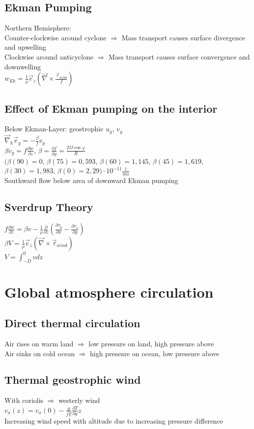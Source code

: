 \subsection*{Ekman Pumping}
Northern Hemisphere:\\
Counter-clockwise around cyclone $\Rightarrow$ Mass transport causes surface divergence and upwelling\\
Clockwise around anticyclone $\Rightarrow$ Mass transport causes surface convergence and downwelling\\
$w_{Ek}=\frac{1}{\rho}\vec{e}_z(\vec{\nabla}\times\frac{\vec{\tau}_{wind}}{f})$
\subsection*{Effect of Ekman pumping on the interior}
Below Ekman-Layer: geostrophic $u_g$, $v_g$\\
$\vec{\nabla}_h\vec{v}_g=-\frac{\beta}{f}v_g$\\
$\beta v_g=f\frac{\partial w}{\partial z}$, $\beta = \frac{\partial f}{\partial y}=\frac{2\Omega\cos{\varphi}}{R}$\\
$(\beta(90)=0$, $\beta(75)=0,593$, $\beta(60)=1,145$, $\beta(45)=1,619$, $\beta(30)=1,983$, $\beta(0)=2,29)\cdot10^{-11}\frac{1}{ms}$\\
Southward flow below area of downward Ekman pumping
\subsection*{Sverdrup Theory}
$f\frac{\partial w}{\partial z}=\beta v-\frac{1}{\rho}\frac{\partial}{\partial z}\left(\frac{\partial\tau_y}{\partial x}-\frac{\partial\tau_x}{\partial y}\right)$\\
$\beta V=\frac{1}{\rho}\vec{e}_z(\vec{\nabla}\times\vec{\tau}_{wind})$\\
$V=\int_{-D}^0 v dz$
\section*{Global atmosphere circulation}
\subsection*{Direct thermal circulation}
Air rises on warm land $\Rightarrow$ low pressure on land, high pressure above\\
Air sinks on cold ocean $\Rightarrow$ high pressure on ocean, low pressure above\\
\subsection*{Thermal geostrophic wind}
With coriolis $\Rightarrow$ westerly wind\\
$v_x(z)=v_x(0)-\frac{g}{f\bar{T}}\frac{\partial \bar{T}}{\partial y}z$\\
Increasing wind speed with altitude due to increasing pressure difference
